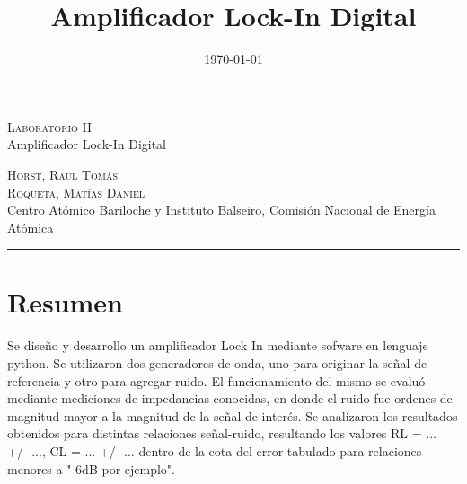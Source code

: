 \documentclass[11pt,a4paper]{extarticle}
\date{\small{\today}}
\begin{document}
\title{Amplificador Lock-In Digital}
	\LARGE{\textsc{Laboratorio II}}\\
	\Large{Amplificador Lock-In Digital}\\
\begin{large}
\small\textsc{Horst, Raúl Tomás}\\
\small\textsc{Roqueta, Matías Daniel}\\
\small{Centro Atómico Bariloche y Instituto Balseiro, Comisión Nacional de Energía Atómica}\\
\end{large}
\setcounter{page}{1}

\chead{}

\rfoot{\thepage} 
\renewcommand{\headrulewidth}{0.4pt} 
\renewcommand{\footrulewidth}{0.4pt} 
\hrule

\normalsize
\section{Resumen}
Se diseño y desarrollo un amplificador Lock In 
mediante sofware en lenguaje python. 
Se utilizaron dos generadores de onda, uno para originar 
la señal de referencia y otro para agregar ruido. 
El funcionamiento del mismo se evaluó mediante 
mediciones de impedancias conocidas, en donde el ruido 
fue ordenes de magnitud mayor a la magnitud de la señal 
de interés. Se analizaron los
resultados obtenidos para distintas relaciones 
señal-ruido, resultando los valores RL = ... +/- ...,
 CL = ... +/- ... dentro de
la cota del error tabulado para relaciones menores a 
"-6dB por ejemplo".
\end{document}
